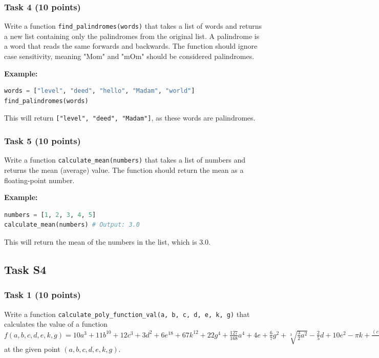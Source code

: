 \documentclass[12pt]{article}
\begin{document}
\subsubsection{Task 4 (10 points)}
Write a function \texttt{find\_palindromes(words)} that takes a list of words and returns a new list containing only the palindromes from the original list. A palindrome is a word that reads the same forwards and backwards. The function should ignore case sensitivity, meaning "Mom" and "mOm" should be considered palindromes.

\textbf{Example:}
\begin{lstlisting}[language=Python]
words = ["level", "deed", "hello", "Madam", "world"]
find_palindromes(words)
\end{lstlisting}
This will return \texttt{["level", "deed", "Madam"]}, as these words are palindromes.

\subsubsection{Task 5 (10 points)}
Write a function \texttt{calculate\_mean(numbers)} that takes a list of numbers and returns the mean (average) value. The function should return the mean as a floating-point number.

\textbf{Example:}
\begin{lstlisting}[language=Python]
numbers = [1, 2, 3, 4, 5]
calculate_mean(numbers) # Output: 3.0
\end{lstlisting}
This will return the mean of the numbers in the list, which is 3.0.


\newpage

\subsection{Task S4}

\subsubsection{Task 1 (10 points)}
Write a function \texttt{calculate\_poly\_function\_val(a, b, c, d, e, k, g)} that calculates the value of a function $f(a, b, c, d, e, k, g) = 10a^3 + 11b^{10} + 12c^3 + 3d^2 + 6e^{18} + 67k^{12} + 22g^4 + \frac{127}{168}a^4 + 4e + \frac{6}{7}g^2 + \sqrt[3]{\frac{3}{2}a^2} - \frac{2}{5}d + 10e^2 - \pi k + \frac{(c + d + k + g)a^2}{b}$ at the given point $(a, b, c, d, e, k, g)$.
\end{document}
